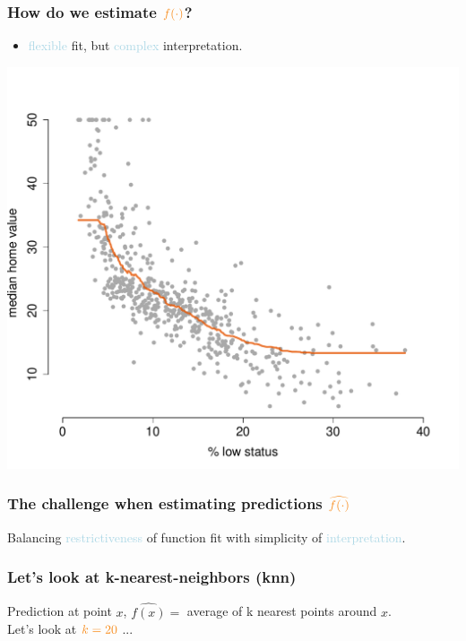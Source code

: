 \documentclass{beamer}
\newcommand{\bo}[1]{\textcolor{burntorange}{#1}}
\newcommand{\lb}[1]{\textcolor{lightblue}{#1}}
\begin{document}
\begin{frame}[plain]
\frametitle{How do we estimate $\bo{f(\cdot)}$?}
\vspace{5mm}
\begin{itemize}
\item[] \bo{\lb{flexible} fit, but \lb{complex} interpretation}.
\end{itemize}
\vspace{-9mm}
\begin{center}
\includegraphics[scale=.39]{DaveBostonplot3.pdf}
\end{center}


\end{frame}


\begin{frame}[plain]
\frametitle{The challenge when estimating predictions $\bo{\widehat{f(\cdot)}}$}
\vspace{5mm}
\Large
Balancing \lb{{restrictiveness}} of function fit with simplicity of \lb{interpretation}.

\end{frame}

\begin{frame}[plain]
\frametitle{Let's look at k-nearest-neighbors (knn)}
\vspace{5mm}
	Prediction at point $x$, $\widehat{f(x)} =$ average of k nearest points around $x$. \\ \vspace{9mm}\pause
Let's look at $\bo{k=20}$ ...
\end{frame}
\end{document}
